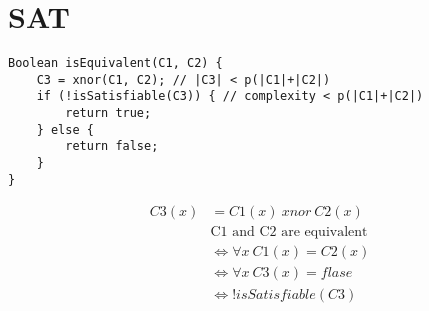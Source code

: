 \documentclass{article}
\begin{document}
\section{SAT}
\begin{lstlisting}
Boolean isEquivalent(C1, C2) {
	C3 = xnor(C1, C2); // |C3| < p(|C1|+|C2|)
	if (!isSatisfiable(C3)) { // complexity < p(|C1|+|C2|)
		return true;
	} else {
		return false;
	}
}
\end{lstlisting}
\begin{align*}
C3(x) &= C1(x) \ xnor \ C2(x) \\
&\text{C1 and C2 are equivalent}\\
&\iff \forall x \ C1(x) = C2(x)\\
&\iff \forall x \ C3(x) = flase\\
&\iff !isSatisfiable(C3)
\end{align*}
\end{document}

